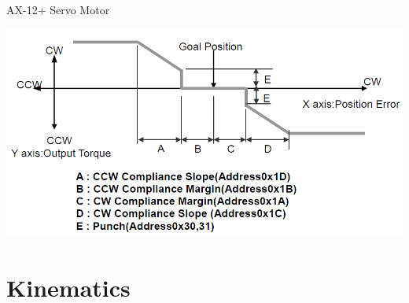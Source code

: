 \documentclass[compress]{beamer}
\begin{document}
\begin{frame}{AX-12+ Servo Motor}
{    \begin{center}
        \includegraphics[width=0.8\linewidth]{image26}
    \end{center}
    }
\end{frame}

\section{Kinematics}
\end{document}
